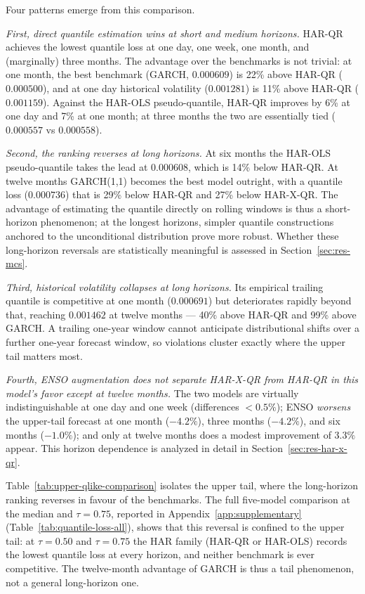 Four patterns emerge from this comparison.

\textit{First, direct quantile estimation wins at short and medium
horizons.} HAR-QR achieves the lowest quantile loss at one day, one week,
one month, and (marginally) three months. The advantage over the
benchmarks is not trivial: at one month, the best benchmark (GARCH,
$0.000609$) is 22\% above HAR-QR ($0.000500$), and at one day historical
volatility ($0.001281$) is 11\% above HAR-QR ($0.001159$). Against the
HAR-OLS pseudo-quantile, HAR-QR improves by 6\% at one day and 7\% at one
month; at three months the two are essentially tied ($0.000557$ vs
$0.000558$).

\textit{Second, the ranking reverses at long horizons.} At six months the
HAR-OLS pseudo-quantile takes the lead at $0.000608$, which is 14\% below
HAR-QR. At twelve months GARCH(1,1) becomes the best model outright, with
a quantile loss ($0.000736$) that is 29\% below HAR-QR and 27\% below
HAR-X-QR. The advantage of
estimating the quantile directly on rolling windows is thus a
short-horizon phenomenon; at the longest horizons, simpler quantile
constructions anchored to the unconditional distribution prove more
robust. Whether these long-horizon reversals are statistically meaningful
is assessed in Section~\ref{sec:res-mcs}.

\textit{Third, historical volatility collapses at long horizons.} Its
empirical trailing quantile is competitive at one month ($0.000691$) but
deteriorates rapidly beyond that, reaching $0.001462$ at twelve months ---
40\% above HAR-QR and 99\% above GARCH. A trailing one-year window cannot
anticipate distributional shifts over a further one-year forecast window,
so violations cluster exactly where the upper tail matters most.

\textit{Fourth, ENSO augmentation does not separate HAR-X-QR from HAR-QR
in this model's favor except at twelve months.} The two models are
virtually indistinguishable at one day and one week (differences
$<0.5\%$); ENSO \emph{worsens} the upper-tail forecast at one month
($-4.2\%$), three months ($-4.2\%$), and six months ($-1.0\%$); and only
at twelve months does a modest improvement of $3.3\%$ appear. This
horizon dependence is analyzed in detail in
Section~\ref{sec:res-har-x-qr}.

Table~\ref{tab:upper-qlike-comparison} isolates the upper tail, where the
long-horizon ranking reverses in favour of the benchmarks. The full
five-model comparison at the median and $\tau = 0.75$, reported in
Appendix~\ref{app:supplementary} (Table~\ref{tab:quantile-loss-all}),
shows that this reversal is confined to the upper tail: at $\tau = 0.50$
and $\tau = 0.75$ the HAR family (HAR-QR or HAR-OLS) records the lowest
quantile loss at every horizon, and neither benchmark is ever competitive.
The twelve-month advantage of GARCH is thus a tail phenomenon, not a
general long-horizon one.

